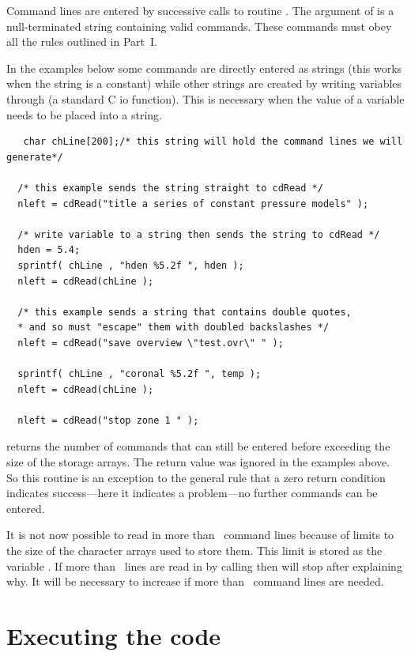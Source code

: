 Command lines are entered by successive calls to routine .  The
argument of  is a null-terminated string containing valid commands.
These commands must obey all the rules outlined in Part~I.

In the examples below some commands are directly entered as strings (this
works when the string is a constant) while other strings are created by
writing variables through  (a standard C io function).  This is
necessary when the value of a variable needs to be placed into a string.
\begin{verbatim}
   char chLine[200];/* this string will hold the command lines we will generate*/

  /* this example sends the string straight to cdRead */
  nleft = cdRead("title a series of constant pressure models" );

  /* write variable to a string then sends the string to cdRead */
  hden = 5.4;
  sprintf( chLine , "hden %5.2f ", hden );
  nleft = cdRead(chLine );

  /* this example sends a string that contains double quotes,
  * and so must "escape" them with doubled backslashes */
  nleft = cdRead("save overview \"test.ovr\" " );

  sprintf( chLine , "coronal %5.2f ", temp );
  nleft = cdRead(chLine );

  nleft = cdRead("stop zone 1 " );
\end{verbatim}

 returns the number of commands that can still be entered before
exceeding the size of the storage arrays.
The return value was ignored
in the examples above.
So this routine is an exception to the general rule
that a zero return condition indicates success---here it indicates a
problem---no further commands can be entered.

It is not now possible to read in more than \NKRD\ command lines because
of limits to the size of the character arrays used to store them.  This
limit is stored as the variable .
If more than \NKRD\ lines are read
in by calling  then  will stop after explaining why.
It will
be necessary to increase  if more than \NKRD\ command lines are needed.

\section{Executing the code}

